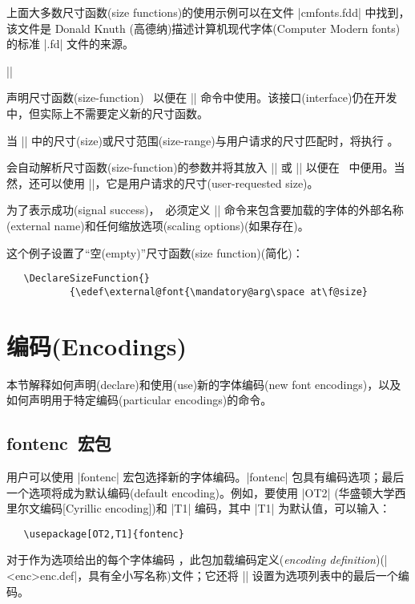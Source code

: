 \documentclass{ltxguide}[1995/11/28]
\newcommand{\heiti}{\CJKfamily{heiti}} %
\newcommand{\kaiti}{\CJKfamily{kaiti}} %
\begin{document}
上面大多数尺寸函数(size functions)的使用示例可以在文件 |cmfonts.fdd| 中找到，该文件是 Donald Knuth (高德纳)描述计算机现代字体(Computer Modern fonts)的标准 |.fd| 文件的来源。


\begin{decl}
  |\DeclareSizeFunction|  
\end{decl}

声明尺寸函数(size-function) \ 以便在 |\DeclareFontShape| 命令中使用。该接口(interface)仍在开发中，但实际上不需要定义新的尺寸函数。

当 |\DeclareFontShape| 中的尺寸(size)或尺寸范围(size-range)与用户请求的尺寸匹配时，将执行 。

会自动解析尺寸函数(size-function)的参数并将其放入 |\mandatory@arg| 或 |\optional@arg| 以便在 \ 中便用。当然，还可以使用 |\f@size|，它是用户请求的尺寸(user-requested size)。

为了表示成功(signal success)，\ 必须定义 |\external@font| 命令来包含要加载的字体的外部名称(external name)和任何缩放选项(scaling options)(如果存在)。

这个例子设置了“空(empty)”尺寸函数(size function)(简化)：
\begin{verbatim}
   \DeclareSizeFunction{}
           {\edef\external@font{\mandatory@arg\space at\f@size}
\end{verbatim}

\newpage

\section{\heiti 编码(Encodings)}
\label{Sec:encode}

本节解释如何声明(declare)和使用(use)新的字体编码(new font encodings)，以及如何声明用于特定编码(particular encodings)的命令。

\subsection[fontenc\ 宏包]{\textsf{fontenc}\ {\heiti 宏包}}

用户可以使用 |fontenc| 宏包选择新的字体编码。|fontenc| 包具有编码选项；最后一个选项将成为默认编码(default encoding)。例如，要使用 |OT2| (华盛顿大学西里尔文编码[Cyrillic encoding])和 |T1| 编码，其中 |T1| 为默认值，可以输入：
\begin{verbatim}
   \usepackage[OT2,T1]{fontenc}
\end{verbatim}

对于作为选项给出的每个字体编码 ，此包加载{\kaiti 编码定义}(\emph{encoding definition})(|<enc>enc.def|，具有全小写名称)文件；它还将 |\encodingdefault| 设置为选项列表中的最后一个编码。
\end{document}
